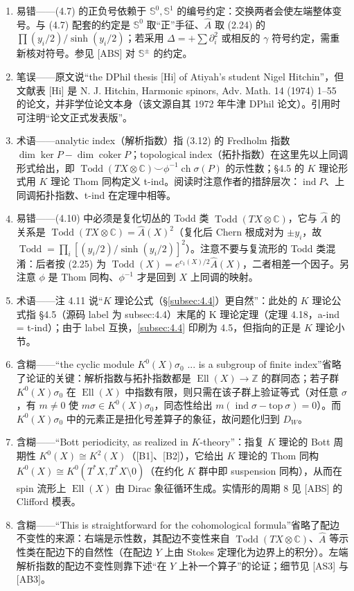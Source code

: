 \documentclass[11pt]{amsart}
\theoremstyle{definition}
\theoremstyle{remark}
\theoremstyle{plain}
\numberwithin{equation}{section}
\renewcommand{\:}{\colon}
\newcommand{\Ahat}{{\hat A}}
\newcommand{\CC}{{\mathbb C}}
\newcommand{\ZZ}{{\mathbb Z}}
\DeclareMathOperator{\ch}{ch}
\DeclareMathOperator{\coker}{coker}
\DeclareMathOperator{\ind}{ind}
\newcommand{\inv}{^{-1}}
\DeclareMathOperator{\Ell}{Ell}
\DeclareMathOperator{\Todd}{Todd}
\renewcommand{\SS}{\mathbb{S}}
\begin{document}
\begin{enumerate}[leftmargin=2.2em,itemsep=2pt,topsep=2pt]
  \item 易错——(4.7) 的正负号依赖于 $\SS^0,\SS^1$ 的编号约定：交换两者会使左端整体变号。与 (4.7) 配套的约定是 $\SS^0$ 取“正”手征、$\Ahat$ 取 (2.24) 的 $\prod(y_i/2)/\sinh(y_i/2)$；若采用 $\Delta=+\sum\partial_i^2$ 或相反的 $\gamma$ 符号约定，需重新核对符号。参见 [ABS] 对 $\SS^\pm$ 的约定。
  \item 笔误——原文说“the DPhil thesis [Hi] of Atiyah's student Nigel Hitchin”，但文献表 [Hi] 是 N. J. Hitchin, Harmonic spinors, Adv. Math. 14 (1974) 1–55 的论文，并非学位论文本身（该文源自其 1972 年牛津 DPhil 论文）。引用时可注明“论文正式发表版”。
  \item 术语——analytic index（解析指数）指 (3.12) 的 Fredholm 指数 $\dim\ker P-\dim\coker P$；topological index（拓扑指数）在这里先以上同调形式给出，即 $\Todd(TX\otimes\CC)\smallsmile\phi^{-1}\ch\sigma(P)$ 的示性数；§4.5 的 $K$ 理论形式用 $K$ 理论 Thom 同构定义 t-ind。阅读时注意作者的措辞层次：$\ind P$、上同调拓扑指数、t-ind 在定理中相等。
  \item 易错——(4.10) 中必须是复化切丛的 Todd 类 $\Todd(TX\otimes\CC)$，它与 $\Ahat$ 的关系是 $\Todd(TX\otimes\CC)=\Ahat(X)^2$（复化后 Chern 根成对为 $\pm y_i$，故 $\Todd=\prod_i[(y_i/2)/\sinh(y_i/2)]^2$）。注意不要与复流形的 Todd 类混淆：后者按 (2.25) 为 $\Todd(X)=e^{c_1(X)/2}\Ahat(X)$，二者相差一个因子。另注意 $\phi$ 是 Thom 同构、$\phi\inv$ 才是回到 $X$ 上同调的映射。
  \item 术语——注 4.11 说“$K$ 理论公式（\S\ref{subsec:4.4}）更自然”：此处的 $K$ 理论公式指 §4.5（源码 label 为 subsec:4.4）末尾的 K 理论定理（定理 4.18，a-ind = t-ind）；由于 label 互换，\ref{subsec:4.4} 印刷为 4.5，但指向的正是 $K$ 理论小节。
  \item 含糊——“the cyclic module $K^0(X)\sigma_0$ ... is a subgroup of finite index”省略了论证的关键：解析指数与拓扑指数都是 $\Ell(X)\to\ZZ$ 的群同态；若子群 $K^0(X)\sigma_0$ 在 $\Ell(X)$ 中指数有限，则只需在该子群上验证等式（对任意 $\sigma$，有 $m\neq0$ 使 $m\sigma\in K^0(X)\sigma_0$，同态性给出 $m(\ind\sigma-\text{top}\ \sigma)=0$）。而 $K^0(X)\sigma_0$ 中的元素正是扭化号差算子的象征，故问题化归到 $D_W$。
  \item 含糊——“Bott periodicity, as realized in $K$-theory”：指复 $K$ 理论的 Bott 周期性 $K^0(X)\cong K^2(X)$（[B1]、[B2]），它给出 $K$ 理论的 Thom 同构 $K^0(X)\cong K^0(T^*X,T^*X\setminus 0)$（在约化 $K$ 群中即 suspension 同构），从而在 spin 流形上 $\Ell(X)$ 由 Dirac 象征循环生成。实情形的周期 8 见 [ABS] 的 Clifford 模表。
  \item 含糊——“This is straightforward for the cohomological formula”省略了配边不变性的来源：右端是示性数，其配边不变性来自 $\Todd(TX\otimes\CC)$、$\Ahat$ 等示性类在配边下的自然性（在配边 $Y$ 上由 Stokes 定理化为边界上的积分）。左端解析指数的配边不变性则靠下述“在 $Y$ 上补一个算子”的论证；细节见 [AS3] 与 [AB3]。

\end{enumerate}
\end{document}
